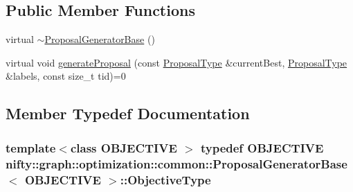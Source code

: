 \subsection*{Public Member Functions}
\begin{DoxyCompactItemize}
\item 
virtual \hyperlink{classnifty_1_1graph_1_1optimization_1_1common_1_1ProposalGeneratorBase_a4c5363ab4380df824d4c7a6371e2a23c}{$\sim$\+Proposal\+Generator\+Base} ()
\item 
virtual void \hyperlink{classnifty_1_1graph_1_1optimization_1_1common_1_1ProposalGeneratorBase_a5751b664edd5f19a0232b3d6527a4135}{generate\+Proposal} (const \hyperlink{classnifty_1_1graph_1_1optimization_1_1common_1_1ProposalGeneratorBase_a4700eb43beb708a77c5c34612039c715}{Proposal\+Type} \&current\+Best, \hyperlink{classnifty_1_1graph_1_1optimization_1_1common_1_1ProposalGeneratorBase_a4700eb43beb708a77c5c34612039c715}{Proposal\+Type} \&labels, const size\+\_\+t tid)=0
\end{DoxyCompactItemize}


\subsection{Member Typedef Documentation}
\hypertarget{classnifty_1_1graph_1_1optimization_1_1common_1_1ProposalGeneratorBase_a26b2bcec6047d728078e1dc78d934876}{}
\subsubsection[{Objective\+Type}]{\setlength{\rightskip}{0pt plus 5cm}template$<$class O\+B\+J\+E\+C\+T\+I\+V\+E $>$ typedef O\+B\+J\+E\+C\+T\+I\+V\+E {\bf nifty\+::graph\+::optimization\+::common\+::\+Proposal\+Generator\+Base}$<$ O\+B\+J\+E\+C\+T\+I\+V\+E $>$\+::{\bf Objective\+Type}}\label{classnifty_1_1graph_1_1optimization_1_1common_1_1ProposalGeneratorBase_a26b2bcec6047d728078e1dc78d934876}
\hypertarget{classnifty_1_1graph_1_1optimization_1_1common_1_1ProposalGeneratorBase_a4700eb43beb708a77c5c34612039c715}{}
